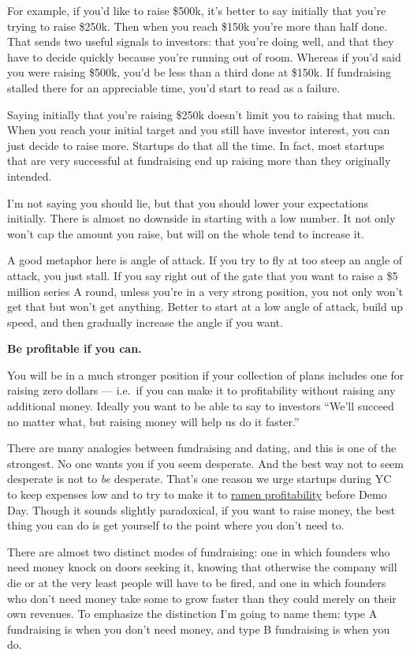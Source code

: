 For example, if you'd like to raise \$500k, it's better to say initially
that you're trying to raise \$250k. Then when you reach \$150k you're
more than half done. That sends two useful signals to investors: that
you're doing well, and that they have to decide quickly because you're
running out of room. Whereas if you'd said you were raising \$500k,
you'd be less than a third done at \$150k. If fundraising stalled there
for an appreciable time, you'd start to read as a failure.

Saying initially that you're raising \$250k doesn't limit you to raising
that much. When you reach your initial target and you still have
investor interest, you can just decide to raise more. Startups do that
all the time. In fact, most startups that are very successful at
fundraising end up raising more than they originally intended.

I'm not saying you should lie, but that you should lower your
expectations initially. There is almost no downside in starting with a
low number. It not only won't cap the amount you raise, but will on the
whole tend to increase it.

A good metaphor here is angle of attack. If you try to fly at too steep
an angle of attack, you just stall. If you say right out of the gate
that you want to raise a \$5 million series A round, unless you're in a
very strong position, you not only won't get that but won't get
anything. Better to start at a low angle of attack, build up speed, and
then gradually increase the angle if you want.

\textbf{Be profitable if you can.}

You will be in a much stronger position if your collection of plans
includes one for raising zero dollars --- i.e.~if you can make it to
profitability without raising any additional money. Ideally you want to
be able to say to investors ``We'll succeed no matter what, but raising
money will help us do it faster.''

There are many analogies between fundraising and dating, and this is one
of the strongest. No one wants you if you seem desperate. And the best
way not to seem desperate is not to \emph{be} desperate. That's one
reason we urge startups during YC to keep expenses low and to try to
make it to \href{ramenprofitable.html}{ramen profitability} before Demo
Day. Though it sounds slightly paradoxical, if you want to raise money,
the best thing you can do is get yourself to the point where you don't
need to.

There are almost two distinct modes of fundraising: one in which
founders who need money knock on doors seeking it, knowing that
otherwise the company will die or at the very least people will have to
be fired, and one in which founders who don't need money take some to
grow faster than they could merely on their own revenues. To emphasize
the distinction I'm going to name them: type A fundraising is when you
don't need money, and type B fundraising is when you do.

